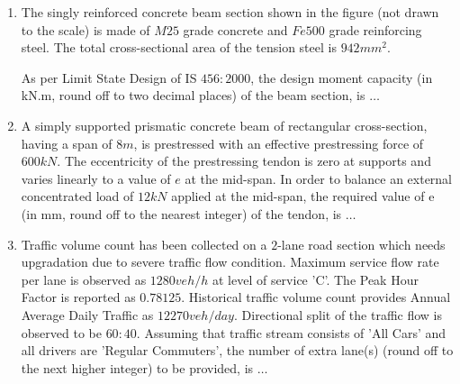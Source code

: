 \documentclass[journal]{IEEEtran}
\begin{document}
\begin{enumerate}[start=40]
    \item The singly reinforced concrete beam section shown in the figure (not drawn to the scale) is made of $M25$ grade concrete and $Fe500$ grade reinforcing steel. The total cross-sectional area of the tension steel is $942 mm^2$.
    \begin{figure}[H]
\centering
{}%

\label{fig:my_label}
\end{figure}
    As per Limit State Design of IS $456:2000$, the design moment capacity (in kN.m, round off to two decimal places) of the beam section, is $\dots$

    \item A simply supported prismatic concrete beam of rectangular cross-section, having a span of $8 m$, is prestressed with an effective prestressing force of $600 kN$. The eccentricity of the prestressing tendon is zero at supports and varies linearly to a value of $e$ at the mid-span. In order to balance an external concentrated load of $12 kN$ applied at the mid-span, the required value of e (in mm, round off to the nearest integer) of the tendon, is $\dots$

    \item Traffic volume count has been collected on a $2$-lane road section which needs upgradation due to severe traffic flow condition. Maximum service flow rate per lane is observed as $1280 veh/h$ at level of service 'C'. The Peak Hour Factor is reported as $0.78125$. Historical traffic volume count provides Annual Average Daily Traffic as $12270 veh/day$. Directional split of the traffic flow is observed to be $60:40$. Assuming that traffic stream consists of 'All Cars' and all drivers are 'Regular Commuters', the number of extra lane(s) (round off to the next higher integer) to be provided, is $\dots$


\end{enumerate}
\end{document}
